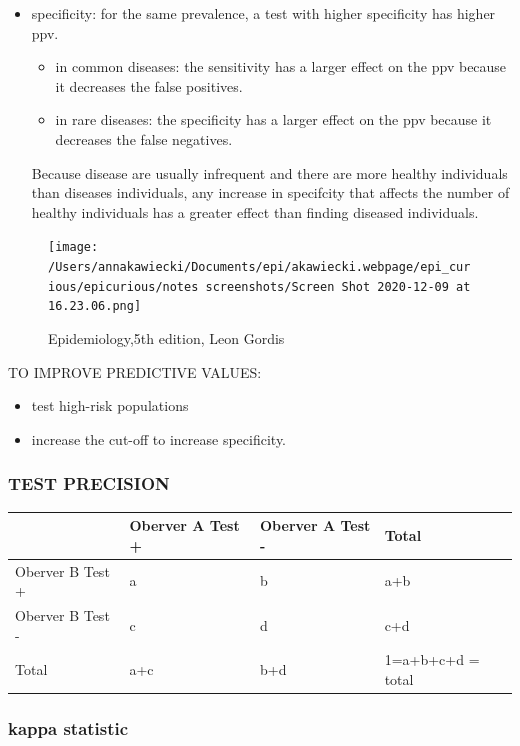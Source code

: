 \documentclass[
]{article}
\begin{document}
\begin{itemize}
\item
  specificity: for the same prevalence, a test with higher specificity
  has higher ppv.

  \begin{itemize}
  \item
    in common diseases: the sensitivity has a larger effect on the ppv
    because it decreases the false positives.
  \item
    in rare diseases: the specificity has a larger effect on the ppv
    because it decreases the false negatives.
  \end{itemize}

  Because disease are usually infrequent and there are more healthy
  individuals than diseases individuals, any increase in specifcity that
  affects the number of healthy individuals has a greater effect than
  finding diseased individuals.
\end{itemize}

\begin{figure}
\centering
\texttt{[image: /Users/annakawiecki/Documents/epi/akawiecki.webpage/epi\_curious/epicurious/notes screenshots/Screen Shot 2020-12-09 at 16.23.06.png]}
\caption{Epidemiology,5th edition, Leon Gordis}
\end{figure}

TO IMPROVE PREDICTIVE VALUES:

\begin{itemize}
\item
  test high-risk populations
\item
  increase the cut-off to increase specificity.
\end{itemize}

\hypertarget{test-precision}{%
\subsubsection{TEST PRECISION}\label{test-precision}}

\begin{longtable}[]{@{}llll@{}}
\toprule
& Oberver A Test + & Oberver A Test - & Total\tabularnewline
\midrule
\endhead
Oberver B Test + & a & b & a+b\tabularnewline
Oberver B Test - & c & d & c+d\tabularnewline
Total & a+c & b+d & 1=a+b+c+d = total\tabularnewline
\bottomrule
\end{longtable}

\hypertarget{kappa-statistic}{%
\subsubsection{kappa statistic}\label{kappa-statistic}}
\end{document}
